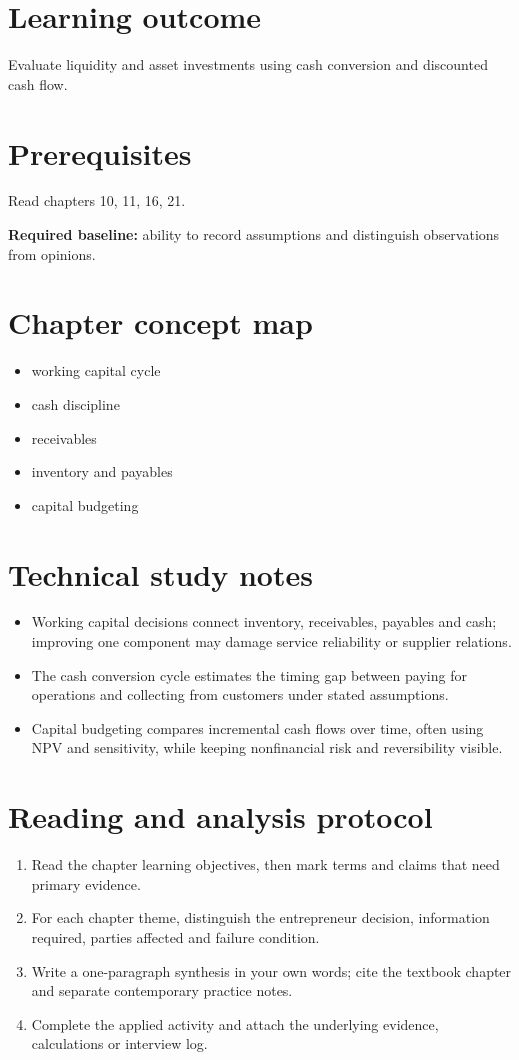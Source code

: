 \documentclass[11pt,letterpaper]{article}
\begin{document}
\SuiteOpen
\section{Learning outcome}
Evaluate liquidity and asset investments using cash conversion and discounted cash flow.
\section{Prerequisites}
Read chapters 10, 11, 16, 21.\par\textbf{Required baseline:} ability to record assumptions and distinguish observations from opinions.
\section{Chapter concept map}
\begin{itemize}[leftmargin=*,itemsep=3pt]
\item working capital cycle
\item cash discipline
\item receivables
\item inventory and payables
\item capital budgeting
\end{itemize}

\section{Technical study notes}
\begin{itemize}[leftmargin=*,itemsep=3pt]
\item Working capital decisions connect inventory, receivables, payables and cash; improving one component may damage service reliability or supplier relations.
\item The cash conversion cycle estimates the timing gap between paying for operations and collecting from customers under stated assumptions.
\item Capital budgeting compares incremental cash flows over time, often using NPV and sensitivity, while keeping nonfinancial risk and reversibility visible.
\end{itemize}

\section{Reading and analysis protocol}
\begin{enumerate}[leftmargin=*,itemsep=5pt]
\item Read the chapter learning objectives, then mark terms and claims that need primary evidence.
\item For each chapter theme, distinguish the entrepreneur decision, information required, parties affected and failure condition.
\item Write a one-paragraph synthesis in your own words; cite the textbook chapter and separate contemporary practice notes.
\item Complete the applied activity and attach the underlying evidence, calculations or interview log.
\end{enumerate}
\end{document}
